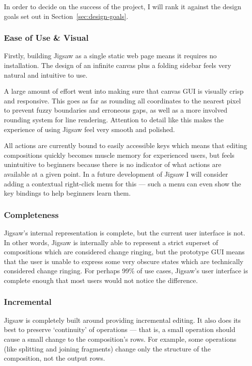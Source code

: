 \documentclass[12pt]{article}
\begin{document}
In order to decide on the success of the project, I will rank it against the design goals set out in
Section~\ref{sec:design-goals}.

\subsubsection{Ease of Use \& Visual}

Firstly, building Jigsaw as a single static web page means it requires no installation.  The
design of an infinite canvas plus a folding sidebar feels very natural and intuitive to use.

A large amount of effort went into making sure that canvas GUI is visually crisp and responsive.  This
goes as far as rounding all coordinates to the nearest pixel to prevent fuzzy boundaries and
erroneous gaps, as well as a more involved rounding system for line rendering.  Attention to detail like this makes
the experience of using Jigsaw feel very smooth and polished.

All actions are currently bound to easily accessible keys which means that editing compositions
quickly becomes muscle memory for experienced users, but feels unintuitive to beginners because
there is no indicator of what actions are available at a given point.  In a future development of
Jigsaw I will consider adding a contextual right-click menu for this --- such a menu can even show the key
bindings to help beginners learn them.

\subsubsection{Completeness}

Jigsaw's internal representation is complete, but the current user interface is not.  In other
words, Jigsaw is internally able to represent a strict superset of compositions which are considered
change ringing, but the prototype GUI means that the user is unable to express some very obscure
states which are technically considered change ringing.  For perhaps 99\% of use cases, Jigsaw's
user interface is complete enough that most users would not notice the difference.

\subsubsection{Incremental}

Jigsaw is completely built around providing incremental editing.  It also does its best to preserve `continuity'
of operations --- that is, a small operation should cause a small change to the composition's rows.
For example, some operations (like splitting and joining fragments) change only the structure of the composition,
not the output rows.
\end{document}
